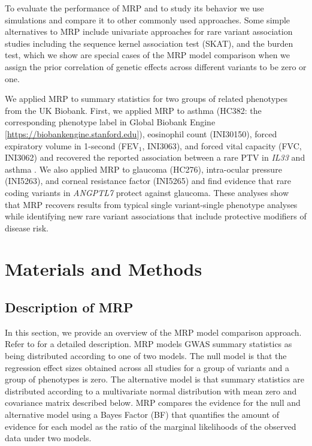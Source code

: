 To evaluate the performance of MRP and to study its behavior we use simulations and compare it to other commonly used approaches. Some simple alternatives to MRP include univariate approaches for rare variant association studies including the sequence kernel association test (SKAT)\cite{skat}, and the burden test, which we show are special cases of the MRP model comparison when we assign the prior correlation of genetic effects across different variants to be zero or one. 
  
We applied MRP to summary statistics for two groups of related phenotypes from the UK Biobank. First, we applied MRP to asthma (HC382: the corresponding phenotype label in Global Biobank Engine [\url{https://biobankengine.stanford.edu}]), eosinophil count (INI30150), forced expiratory volume in 1-second (FEV$_1$, INI3063), and forced vital capacity (FVC, INI3062) and recovered the reported association between a rare PTV in \textit{IL33} and asthma \cite{DeBoever179762, 10.1371/journal.pgen.1006659}. We also applied MRP to glaucoma (HC276), intra-ocular pressure (INI5263), and corneal resistance factor (INI5265) and find evidence that rare coding variants in \textit{ANGPTL7} protect against glaucoma. These analyses show that MRP recovers results from typical single variant-single phenotype analyses while identifying new rare variant associations that include protective modifiers of disease risk.

\section*{Materials and Methods}

\subsection*{Description of MRP}
In this section, we provide an overview of the MRP model comparison approach. Refer to  for a detailed description. MRP models GWAS summary statistics as being distributed according to one of two models. The null model is that the regression effect sizes obtained across all studies for a group of variants and a group of phenotypes is zero. The alternative model is that summary statistics are distributed according to a multivariate normal distribution with mean zero and covariance matrix described below. MRP compares the evidence for the null and alternative model using a Bayes Factor (BF) that quantifies the amount of evidence for each model as the ratio of the marginal likelihoods of the observed data under two models. 

